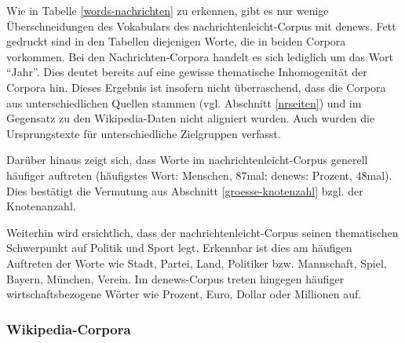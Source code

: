 \documentclass[11pt, a4paper]{article}
\begin{document}
Wie in Tabelle \ref{words-nachrichten} zu erkennen, gibt es nur wenige
Überschneidungen des Vokabulars des nachrichtenleicht-Corpus mit denews.
Fett gedruckt sind in den Tabellen diejenigen Worte, die in beiden Corpora
vorkommen.
Bei den Nachrichten-Corpora handelt es sich lediglich um das Wort "`Jahr"'.
Dies deutet bereits auf eine gewisse thematische Inhomogenität der Corpora hin.
Dieses Ergebnis ist insofern nicht überraschend, dass die Corpora aus
unterschiedlichen Quellen stammen (vgl. Abschnitt \ref{nrseiten}) und
im Gegensatz zu den Wikipedia-Daten nicht aligniert wurden.
Auch wurden die Ursprungstexte für unterschiedliche Zielgruppen verfasst.

Darüber hinaus zeigt sich, dass Worte im nachrichtenleicht-Corpus generell
häufiger auftreten (häufigstes Wort: Menschen, 87mal; denews: Prozent, 48mal).
Dies bestätigt die Vermutung aus Abschnitt \ref{groesse-knotenzahl} bzgl. der
Knotenanzahl.

Weiterhin wird ersichtlich, dass der nachrichtenleicht-Corpus seinen
thematischen Schwerpunkt auf Politik und Sport legt.
Erkennbar ist dies am häufigen Auftreten der Worte wie Stadt, Partei, Land,
Politiker bzw. Mannschaft, Spiel, Bayern, München, Verein.
Im denews-Corpus treten hingegen häufiger wirtschaftsbezogene Wörter wie Prozent,
Euro, Dollar oder Millionen auf.


\subsubsection{Wikipedia-Corpora}
\end{document}
